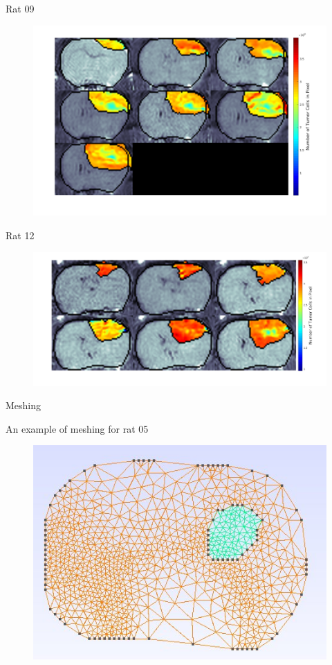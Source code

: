 \documentclass{beamer}
\begin{document}
\begin{frame}{Rat 09}
    \begin{minipage}[t][.7\textheight][t]{\textwidth}
    	\begin{figure}
    	\centering
    	\includegraphics[width=.9\textwidth]{../../mouse-data/images/Montage09.png}
    	\end{figure}
	\end{minipage}  
\end{frame}

\begin{frame}{Rat 12}
    \begin{minipage}[t][.7\textheight][t]{\textwidth}
    	\begin{figure}
    	\centering
    	\includegraphics[width=.9\textwidth]{../../mouse-data/images/Montage12.png}
    	\end{figure}
	\end{minipage}  
\end{frame}

\begin{frame}{Meshing}
    \begin{minipage}[t][.7\textheight][t]{\textwidth}
    An example of meshing for rat 05
    	\begin{figure}
    	\centering
    	\includegraphics[width=.7\textwidth]{../../mouse-data/images/mesh05.png}
    	\end{figure}
	\end{minipage}  
\end{frame}
\end{document}
